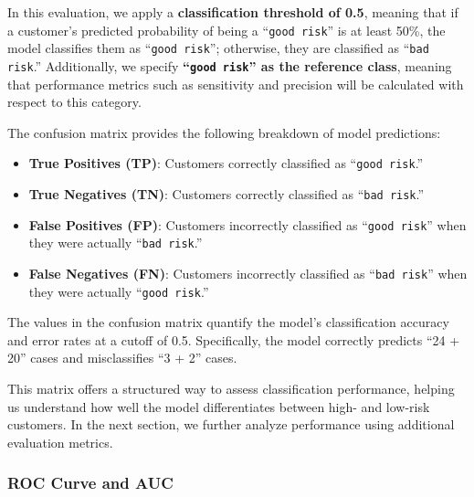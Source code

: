 \documentclass[
]{book}
\newcommand{\passthrough}[1]{#1}
\providecommand{\tightlist}{%
  \setlength{\itemsep}{0pt}\setlength{\parskip}{0pt}}
\theoremstyle{definition}
\theoremstyle{definition}
\theoremstyle{definition}
\theoremstyle{definition}
\theoremstyle{remark}
\begin{document}
In this evaluation, we apply a \textbf{classification threshold of 0.5}, meaning that if a customer's predicted probability of being a ``\passthrough{\lstinline!good risk!}'' is at least 50\%, the model classifies them as ``\passthrough{\lstinline!good risk!}''; otherwise, they are classified as ``\passthrough{\lstinline!bad risk!}.'' Additionally, we specify \textbf{``\passthrough{\lstinline!good risk!}'' as the reference class}, meaning that performance metrics such as sensitivity and precision will be calculated with respect to this category.

The confusion matrix provides the following breakdown of model predictions:

\begin{itemize}
\tightlist
\item
  \textbf{True Positives (TP)}: Customers correctly classified as ``\passthrough{\lstinline!good risk!}.''\\
\item
  \textbf{True Negatives (TN)}: Customers correctly classified as ``\passthrough{\lstinline!bad risk!}.''\\
\item
  \textbf{False Positives (FP)}: Customers incorrectly classified as ``\passthrough{\lstinline!good risk!}'' when they were actually ``\passthrough{\lstinline!bad risk!}.''\\
\item
  \textbf{False Negatives (FN)}: Customers incorrectly classified as ``\passthrough{\lstinline!bad risk!}'' when they were actually ``\passthrough{\lstinline!good risk!}.''
\end{itemize}

The values in the confusion matrix quantify the model's classification accuracy and error rates at a cutoff of 0.5. Specifically, the model correctly predicts ``24 + 20'' cases and misclassifies ``3 + 2'' cases.

This matrix offers a structured way to assess classification performance, helping us understand how well the model differentiates between high- and low-risk customers. In the next section, we further analyze performance using additional evaluation metrics.

\subsubsection*{ROC Curve and AUC}\label{roc-curve-and-auc-1}
\end{document}
